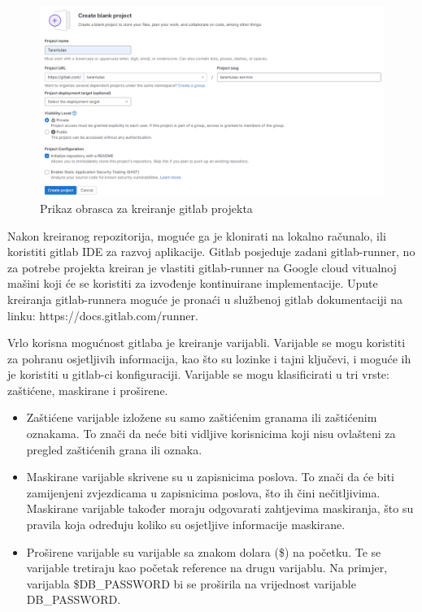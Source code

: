 \documentclass[a4paper,12pt,oneside]{article}
\begin{document}
\begin{figure}
    \centering
    \includegraphics[width=1\linewidth]{Slike/git-create-blank-project.png}
    \caption{Prikaz obrasca za kreiranje gitlab projekta \cite{springArchitectureLayers}}
    \label{fig:git-create-blank}
\end{figure}

Nakon kreiranog repozitorija, moguće ga je klonirati na lokalno računalo, ili koristiti gitlab IDE za razvoj aplikacije. Gitlab posjeduje zadani gitlab-runner, no za potrebe projekta kreiran je vlastiti gitlab-runner na Google cloud vitualnoj mašini koji će se koristiti za izvođenje kontinuirane implementacije. Upute kreiranja gitlab-runnera moguće je pronaći u službenoj gitlab dokumentaciji na linku: https://docs.gitlab.com/runner.  

Vrlo korisna mogućnost gitlaba je kreiranje varijabli. Varijable se mogu koristiti za pohranu osjetljivih informacija, kao što su lozinke i tajni ključevi, i moguće ih je koristiti u gitlab-ci konfiguraciji. Varijable se mogu klasificirati u tri vrste: zaštićene, maskirane i proširene.
\begin{itemize}
    \item Zaštićene varijable izložene su samo zaštićenim granama ili zaštićenim oznakama. To znači da neće biti vidljive korisnicima koji nisu ovlašteni za pregled zaštićenih grana ili oznaka.
    \item Maskirane varijable skrivene su u zapisnicima poslova. To znači da će biti zamijenjeni zvjezdicama u zapisnicima poslova, što ih čini nečitljivima. Maskirane varijable također moraju odgovarati zahtjevima maskiranja, što su pravila koja određuju koliko su osjetljive informacije maskirane.
    \item Proširene varijable su varijable sa znakom dolara (\$) na početku. Te se varijable tretiraju kao početak reference na drugu varijablu. Na primjer, varijabla \$DB\_PASSWORD bi se proširila na vrijednost varijable DB\_PASSWORD.
\end{itemize}
\end{document}
